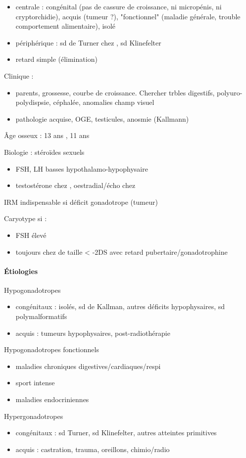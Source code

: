 \documentclass[11pt]{article}
\begin{document}
\begin{itemize}
\item centrale : congénital (pas de cassure de croissance, ni micropénis, ni
cryptorchidie), acquis (tumeur ?), "fonctionnel" (maladie générale, trouble
comportement alimentaire), isolé
\item périphérique : sd de Turner chez \female, sd Klinefelter \male
\item retard simple (élimination)
\end{itemize}

Clinique : 
\begin{itemize}
\item parents, grossesse, courbe de croissance. Chercher trbles digestifs, polyuro-polydispsie, céphalée, anomalies champ visuel
\item pathologie acquise, OGE, testicules, anosmie (Kallmann)
\end{itemize}

Âge osseux : 13 ans \male, 11 ans \female

Biologie : stéroïdes sexuels
\begin{itemize}
\item FSH, LH basses \thus hypothalamo-hypophysaire
\item testostérone chez \male, oestradial/écho chez \female
\end{itemize}

IRM indispensable si déficit gonadotrope (tumeur) \danger

Caryotype si :
\begin{itemize}
\item FSH élevé
\item toujours chez \female{} de taille < -2DS avec retard pubertaire/gonadotrophine \inc
\end{itemize}

\paragraph{Étiologies}
\label{sec:org5432bae}
Hypogonadotropes
\begin{itemize}
\item congénitaux : isolés, sd de Kallman, autres déficits hypophysaires, sd
polymalformatifs
\item acquis : tumeurs hypophysaires, post-radiothérapie
\end{itemize}
Hypogonadotropes fonctionnels
\begin{itemize}
\item maladies chroniques digestives/cardiaques/respi
\item sport intense
\item maladies endocriniennes
\end{itemize}
Hypergonadotropes
\begin{itemize}
\item congénitaux : sd Turner, sd Klinefelter, autres atteintes primitives
\item acquis : castration, trauma, oreillons, chimio/radio
\end{itemize}
\end{document}
